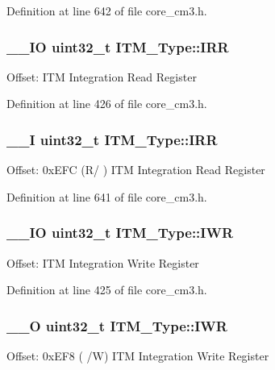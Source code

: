 Definition at line 642 of file core\-\_\-cm3.\-h.

\hypertarget{struct_i_t_m___type_ae43a66174b8ab182ff595e5f5da9f235}{
\subsubsection[{I\-R\-R}]{\setlength{\rightskip}{0pt plus 5cm}\-\_\-\-\_\-\-I\-O {\bf uint32\-\_\-t} I\-T\-M\-\_\-\-Type\-::\-I\-R\-R}}\label{struct_i_t_m___type_ae43a66174b8ab182ff595e5f5da9f235}
Offset\-: I\-T\-M Integration Read Register 

Definition at line 426 of file core\-\_\-cm3.\-h.

\hypertarget{struct_i_t_m___type_a212a614a8d5f2595e5eb049e5143c739}{
\subsubsection[{I\-R\-R}]{\setlength{\rightskip}{0pt plus 5cm}\-\_\-\-\_\-\-I {\bf uint32\-\_\-t} I\-T\-M\-\_\-\-Type\-::\-I\-R\-R}}\label{struct_i_t_m___type_a212a614a8d5f2595e5eb049e5143c739}
Offset\-: 0x\-E\-F\-C (R/ ) I\-T\-M Integration Read Register 

Definition at line 641 of file core\-\_\-cm3.\-h.

\hypertarget{struct_i_t_m___type_af53499fc94cda629afb2fec858d2ad1c}{
\subsubsection[{I\-W\-R}]{\setlength{\rightskip}{0pt plus 5cm}\-\_\-\-\_\-\-I\-O {\bf uint32\-\_\-t} I\-T\-M\-\_\-\-Type\-::\-I\-W\-R}}\label{struct_i_t_m___type_af53499fc94cda629afb2fec858d2ad1c}
Offset\-: I\-T\-M Integration Write Register 

Definition at line 425 of file core\-\_\-cm3.\-h.

\hypertarget{struct_i_t_m___type_afd0e0c051acd3f6187794a4e8dc7e7ea}{
\subsubsection[{I\-W\-R}]{\setlength{\rightskip}{0pt plus 5cm}\-\_\-\-\_\-\-O {\bf uint32\-\_\-t} I\-T\-M\-\_\-\-Type\-::\-I\-W\-R}}\label{struct_i_t_m___type_afd0e0c051acd3f6187794a4e8dc7e7ea}
Offset\-: 0x\-E\-F8 ( /\-W) I\-T\-M Integration Write Register 


